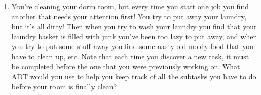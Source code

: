 \documentclass{article}
\begin{document}
\begin{enumerate}
\item
You're cleaning your dorm room, but every time you start one job you
find another that needs your attention first! You try to put away your
laundry, but it's all dirty! Then when you try to wash your laundry
you find that your laundry basket is filled with junk you've been too
lazy to put away, and when you try to put some stuff away you find
some nasty old moldy food that you have to clean up, etc.
Note that each time you discover a new task, it must be completed
before the one that you were previously working on. 
What ADT would you use to help you keep track of all the subtasks you have to
do before your room is finally clean?

\end{enumerate}
\end{document}
